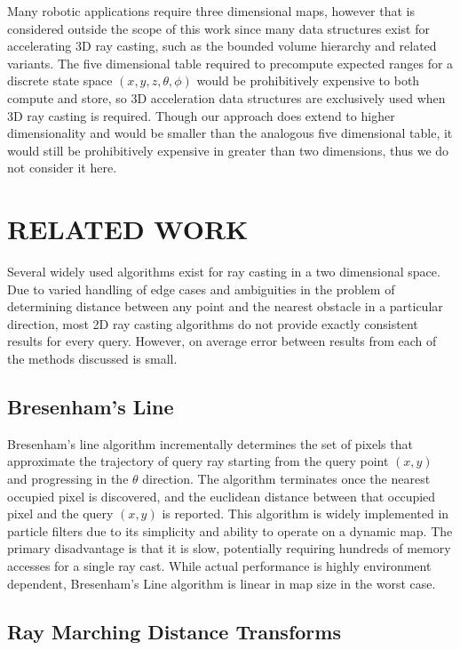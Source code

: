 \documentclass[letterpaper, 10 pt, conference]{ieeeconf}  %
\begin{document}
Many robotic applications require three dimensional maps, however that is considered outside the scope of this work since many data structures exist for accelerating 3D ray casting, such as the bounded volume hierarchy and related variants. The five dimensional table required to precompute expected ranges for a discrete state space $(x,y,z,\theta,\phi)$ would be prohibitively expensive to both compute and store, so 3D acceleration data structures are exclusively used when 3D ray casting is required. Though our approach does extend to higher dimensionality and would be smaller than the analogous five dimensional table, it would still be prohibitively expensive in greater than two dimensions, thus we do not consider it here.

\section{RELATED WORK}

Several widely used algorithms exist for ray casting in a two dimensional space. Due to varied handling of edge cases and ambiguities in the problem of determining distance between any point and the nearest obstacle in a particular direction, most 2D ray casting algorithms do not provide exactly consistent results for every query. However, on average error between results from each of the methods discussed is small.

\subsection{Bresenham's Line}

Bresenham's line algorithm \cite{bresenham} incrementally determines the set of pixels that approximate the trajectory of query ray starting from the query point $(x,y)$ and progressing in the $\theta$ direction. The algorithm terminates once the nearest occupied pixel is discovered, and the euclidean distance between that occupied pixel and the query $(x,y)$ is reported. This algorithm is widely implemented in particle filters due to its simplicity and ability to operate on a dynamic map. The primary disadvantage is that it is slow, potentially requiring hundreds of memory accesses for a single ray cast. While actual performance is highly environment dependent, Bresenham’s Line algorithm is linear in map size in the worst case.

\subsection{Ray Marching Distance Transforms}
\end{document}
